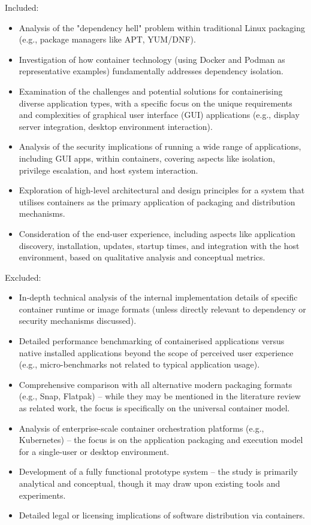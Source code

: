 \documentclass[journal,onecolumn]{IEEEtran}
\begin{document}
Included: 
\begin{itemize}[]
    \item Analysis of the "dependency hell" problem within traditional Linux packaging (e.g., package managers like APT, YUM/DNF). 
    \item Investigation of how container technology (using Docker and Podman as representative examples) fundamentally addresses dependency isolation. 
    \item Examination of the challenges and potential solutions for containerising diverse application types, with a specific focus on the unique requirements and complexities of graphical user interface (GUI) applications (e.g., display server integration, desktop environment interaction). 
    \item Analysis of the security implications of running a wide range of applications, including GUI apps, within containers, covering aspects like isolation, privilege escalation, and host system interaction. 
    \item Exploration of high-level architectural and design principles for a system that utilises containers as the primary application of packaging and distribution mechanisms. 
    \item Consideration of the end-user experience, including aspects like application discovery, installation, updates, startup times, and integration with the host environment, based on qualitative analysis and conceptual metrics. 
\end{itemize}

Excluded:
\begin{itemize}
    \item In-depth technical analysis of the internal implementation details of specific container runtime or image formats (unless directly relevant to dependency or security mechanisms discussed). 
    \item Detailed performance benchmarking of containerised applications versus native installed applications beyond the scope of perceived user experience (e.g., micro-benchmarks not related to typical application usage). 
    \item Comprehensive comparison with all alternative modern packaging formats (e.g., Snap, Flatpak) – while they may be mentioned in the literature review as related work, the focus is specifically on the universal container model. 
    \item Analysis of enterprise-scale container orchestration platforms (e.g., Kubernetes) – the focus is on the application packaging and execution model for a single-user or desktop environment. 
    \item Development of a fully functional prototype system – the study is primarily analytical and conceptual, though it may draw upon existing tools and experiments. 
    \item Detailed legal or licensing implications of software distribution via containers. 
\end{itemize}
\end{document}
